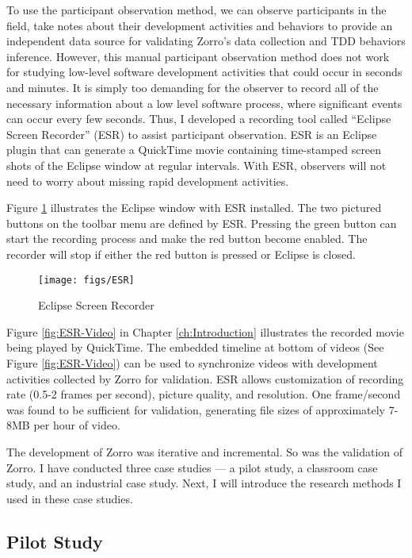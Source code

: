 To use the participant observation method, we can observe participants in the field, take notes about their development activities and behaviors to provide an independent data source for validating Zorro's data collection and TDD behaviors inference. However, this manual participant observation method \cite{Creswell:03} does not work for studying low-level software development activities that could occur in seconds and minutes. It is simply too demanding for the observer to record all of the necessary information about a low level software process, where significant events can occur every few seconds. Thus, I developed a recording tool called ``Eclipse Screen Recorder'' (ESR) to assist participant observation. ESR is an Eclipse plugin that can generate a QuickTime movie containing time-stamped screen shots of the Eclipse window at regular intervals. With ESR, observers will not need to worry about missing rapid development activities. 

Figure \ref{fig:ESR} illustrates the Eclipse window with ESR installed. The two pictured buttons on the toolbar menu are defined by ESR. Pressing the green button can start the recording process and make the red button become enabled. The recorder will stop if either the red button is pressed or Eclipse is closed. 
\begin{figure}[htbp]
  \centering
  \texttt{[image: figs/ESR]}
  \caption{Eclipse Screen Recorder}
  \label{fig:ESR}
\end{figure}
Figure \ref{fig:ESR-Video} in Chapter \ref{ch:Introduction} illustrates the recorded movie being played by QuickTime. The embedded timeline at bottom of videos (See Figure \ref{fig:ESR-Video}) can be used to synchronize videos with development activities collected by Zorro for validation. ESR allows customization of recording rate (0.5-2 frames per second), picture quality, and resolution. One frame/second was found to be sufficient for validation, generating file sizes of approximately 7-8MB per hour of video. 

The development of Zorro was iterative and incremental. So was the validation of Zorro. I have conducted three case studies --- a pilot study, a classroom case study, and an industrial case study. Next, I will introduce the research methods I used in these case studies.

\subsection{Pilot Study}

